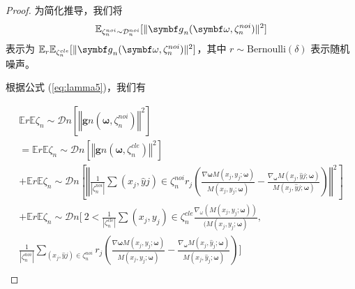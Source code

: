 \begin{proof}
为简化推导，我们将
$$
\mathbb{E}_{\zetanoi_n\sim \Dnoi_n}[\Vert \gb_n(\omegab, \zetanoi_n) \Vert^2]
$$
表示为 $\mathbb{E}_r\mathbb{E}_{\zetacle_n}[\Vert \gb_n(\omegab, \zetanoi_n) \Vert^2]$，其中 $r \sim \text{Bernoulli}(\delta)$ 表示随机噪声。

\noindent 根据公式 (\ref{eq:lamma5})，我们有

\begin{multline}\label{eq:proof-b-s1}
\mathbb{E}{r}\mathbb{E}{\zeta_n\sim \mathcal{D}n}\left[\left\Vert \boldsymbol{g}n\left(\boldsymbol{\omega}, \zeta_n^{noi}\right) \right\Vert^2\right]\\
=\mathbb{E}{r}\mathbb{E}{\zeta_n\sim \mathcal{D}n}\left[\left\Vert\boldsymbol{g}n\left(\boldsymbol{\omega},\zeta_n^{cle}\right)\right\Vert^2\right]\\
+\mathbb{E}{r}\mathbb{E}{\zeta_n\sim \mathcal{D}n}\left[\left\Vert\frac{1}{|\zeta_n^{noi}|}\sum{\left(x_j,\hat{y}j\right)\in \zeta_n^{noi}}r_j\left( \frac{\nabla{\boldsymbol{\omega}} M\left(x_j, y_j; \boldsymbol{\omega}\right)}{M\left(x_j, y_j; \boldsymbol{\omega}\right)}-\frac{\nabla_{\boldsymbol{\omega}} M\left(x_j, \hat{y}j; \boldsymbol{\omega}\right)}{M\left(x_j, \hat{y}j; \boldsymbol{\omega}\right)} \right)\right\Vert^2\right]\\
+\mathbb{E}{r}\mathbb{E}{\zeta_n\sim \mathcal{D}n}\Biggl[\ 2<\frac{1}{|\zeta_n^{cle}|}\sum{\left(x_j,y_j\right)\in \zeta_n^{cle}}\frac{ \nabla_\omega \left(M\left(x_j, y_j; \boldsymbol{\omega}\right)\right)}{(M\left(x_j, y_j; \boldsymbol{\omega}\right)},\\
\frac{1}{|\zeta_n^{noi}|}\sum_{\left(x_j,\hat{y}j\right)\in \zeta_n^{noi}}r_j\left( \frac{\nabla{\boldsymbol{\omega}} M\left(x_j, y_j; \boldsymbol{\omega}\right)}{M\left(x_j, y_j; \boldsymbol{\omega}\right)}-\frac{\nabla_{\boldsymbol{\omega}} M\left(x_j, \hat{y}_j; \boldsymbol{\omega}\right)}{M\left(x_j, \hat{y}_j; \boldsymbol{\omega}\right)} \right)\Biggl]\\
\end{multline}


\end{proof}
